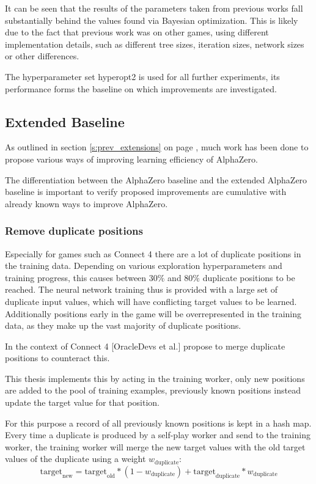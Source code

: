 \documentclass[12pt,onecolumn,oneside,titlepage]{article}
\begin{document}
It can be seen that the results of the parameters taken from previous works fall substantially behind the values found via Bayesian optimization. This is likely due to the fact that previous work was on other games, 
using different implementation details, such as different tree sizes, iteration sizes, network sizes or other differences.

The hyperparameter set hyperopt2 is used for all further experiments, its performance forms the baseline on which improvements are investigated.

\subsection{Extended Baseline} \label{s:exexp}

As outlined in section \ref{s:prev_extensions} on page \pageref{s:prev_extensions}, much work has been done to propose various ways of improving learning efficiency of AlphaZero. 

The differentiation between the AlphaZero baseline and the extended AlphaZero baseline is important to verify proposed improvements are cumulative with already known ways to improve AlphaZero.


\subsubsection{Remove duplicate positions}

Especially for games such as Connect 4 there are a lot of duplicate positions in the training data. Depending on various exploration hyperparameters and training progress, this causes between $30\%$ and $80\%$ duplicate positions to be reached.
The neural network training thus is provided with a large set of duplicate input values, which will have conflicting target values to be learned. Additionally positions early in the game will be overrepresented in the training data, as they make up the vast majority of
duplicate positions.

In the context of Connect 4 \cite{oracledevs6}[OracleDevs et al.] propose to merge duplicate positions to counteract this.

This thesis implements this by acting in the training worker, only new positions are added to the pool of training examples, previously known positions instead update the target value
for that position.

For this purpose a record of all previously known positions is kept in a hash map.
Every time a duplicate is produced by a self-play worker and send to the training worker, the training worker will merge the new target values with the old target values of the duplicate using a weight
$w_{\text{duplicate}}$: $$\text{target}_{\text{new}} = \text{target}_{\text{old}} * (1 - w_{\text{duplicate}}) + \text{target}_{\text{duplicate}} * w_{\text{duplicate}}$$
\end{document}
